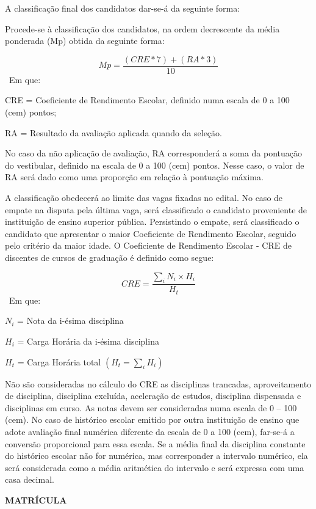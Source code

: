 	A classificação final dos candidatos dar-se-á da seguinte forma:

	Procede-se à classificação dos candidatos, na ordem decrescente da média ponderada (Mp) obtida da seguinte forma:

$$ 
Mp = \frac{(CRE*7) + (RA*3)}{10}
$$
~Em que:

CRE = Coeficiente de Rendimento Escolar, definido numa escala de 0 a 100 (cem) pontos;

RA = Resultado da avaliação aplicada quando da seleção.

	No caso da não aplicação de avaliação, RA corresponderá a soma da pontuação do vestibular, definido na escala de 0 a 100 (cem) pontos. Nesse caso, o valor de RA será dado como uma proporção em relação à pontuação máxima.

	A classificação obedecerá ao limite das vagas fixadas no edital. No caso de empate na disputa pela última vaga, será classificado o candidato proveniente de instituição de ensino superior pública. Persistindo o empate, será classificado o candidato que apresentar o maior Coeficiente de Rendimento Escolar, seguido pelo critério da maior idade. O Coeficiente de Rendimento Escolar - CRE de discentes de cursos de graduação é definido como segue:

$$
CRE = \frac{\sum_{i} N_i \times H_i}{H_t}
$$
~Em que:

$N_i$ = Nota da i-\'esima disciplina

$H_i$ = Carga Horária da i-\'esima disciplina

$H_t$ = Carga Hor\'aria total $(H_t = \sum_{i} H_i)$

	Não são consideradas no cálculo do CRE as disciplinas trancadas, aproveitamento de disciplina, disciplina excluída, aceleração de estudos, disciplina dispensada e disciplinas em curso. As notas devem ser consideradas numa escala de 0 – 100 (cem). No caso de histórico escolar emitido por outra instituição de ensino que adote avaliação final numérica diferente da escala de 0 a 100 (cem), far-se-á a conversão proporcional para essa escala. Se a média final da disciplina constante do histórico escolar não for numérica, mas corresponder a intervalo numérico, ela será considerada como a média aritmética do intervalo e será expressa com uma casa decimal.


\vspace{4mm}
\textbf{MATRÍCULA}
\vspace{4mm}

